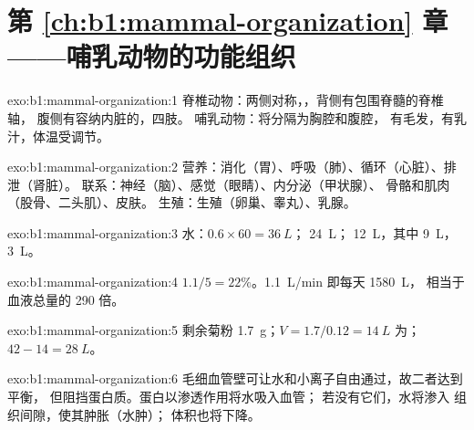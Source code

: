 \section*{第 \ref{ch:b1:mammal-organization} 章——哺乳动物的功能组织}

\begin{solution}{exo:b1:mammal-organization:1}
脊椎动物：两侧对称，，背侧有包围脊髓的脊椎轴，
腹侧有容纳内脏的，四肢。
哺乳动物：将分隔为胸腔和腹腔，
有毛发，有乳汁，体温受调节。
\end{solution}

\begin{solution}{exo:b1:mammal-organization:2}
营养：消化（胃）、呼吸（肺）、循环（心脏）、排泄（肾脏）。
联系：神经（脑）、感觉（眼睛）、内分泌（甲状腺）、
骨骼和肌肉（股骨、二头肌）、皮肤。
生殖：生殖（卵巢、睾丸）、乳腺。
\end{solution}

\begin{solution}{exo:b1:mammal-organization:3}
水：$0.6\times 60 = \qty{36}{L}$； \qty{24}{L}；
 \qty{12}{L}，其中 \qty{9}{L}，
\qty{3}{L}。
\end{solution}

\begin{solution}{exo:b1:mammal-organization:4}
$1.1/5 = 22\%$。\qty{1.1}{L/min} 即每天 \qty{1580}{L}，
相当于血液总量的 290 倍。
\end{solution}

\begin{solution}{exo:b1:mammal-organization:5}
剩余菊粉 \qty{1.7}{g}；$V = 1.7/0.12 = \qty{14}{L}$
为； $42 - 14 = \qty{28}{L}$。
\end{solution}

\begin{solution}{exo:b1:mammal-organization:6}
毛细血管壁可让水和小离子自由通过，故二者达到平衡，
但阻挡蛋白质。蛋白以渗透作用将水吸入血管；
若没有它们，水将渗入
组织间隙，使其肿胀（水肿）；
体积也将下降。
\end{solution}

